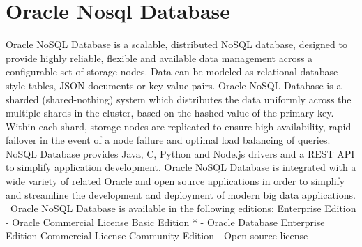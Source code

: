 \section{Oracle Nosql Database}

Oracle NoSQL Database\cite{hid-sp18-515-www-oraclenosql} is a 
scalable, distributed NoSQL database, designed to provide highly 
reliable, flexible and available data management across a 
configurable set of storage nodes.
Data can be modeled as relational-database-style tables, JSON 
documents or key-value pairs. Oracle NoSQL Database is a sharded 
(shared-nothing) system which distributes the data uniformly across 
the multiple shards in the cluster, based on the hashed value of the 
primary key. Within each shard, storage nodes are replicated to ensure 
high availability, rapid failover in the event of a node failure and 
optimal load balancing of queries. NoSQL Database provides Java, C, 
Python and Node.js drivers and a REST API to simplify application 
development. Oracle NoSQL Database is integrated with a wide variety 
of related Oracle and open source applications in order to simplify 
and streamline the development and deployment of modern big data 
applications.  Oracle NoSQL Database is available in the following 
editions: 
Enterprise Edition - Oracle Commercial License
Basic Edition * - Oracle Database Enterprise Edition Commercial 
License
Community Edition - Open source license 
